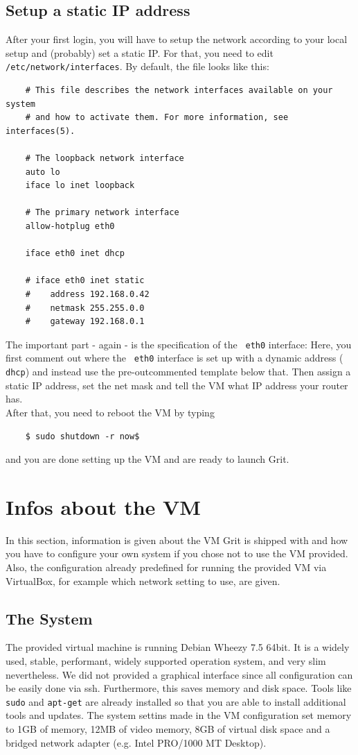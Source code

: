 \documentclass[10pt,a4paper, titlepage, toc=idx]{scrreprt}
\theoremstyle{definition}
\theoremstyle{plain}
\newcommand*{\product}{Grit}
\begin{document}
	\subsection{Setup a static IP address}
	After your first login, you will have to setup the network
        according to your local setup and (probably) set a static
        IP. For that, you need to edit {\tt
          /etc/network/interfaces}. By default, the file looks like
        this:\pagebreak
\begin{lstlisting}
	# This file describes the network interfaces available on your system
	# and how to activate them. For more information, see interfaces(5).
	
	# The loopback network interface
	auto lo
	iface lo inet loopback
	
	# The primary network interface
	allow-hotplug eth0
	
	iface eth0 inet dhcp
	
	# iface eth0 inet static
	#	 address 192.168.0.42
	#	 netmask 255.255.0.0
	#	 gateway 192.168.0.1
\end{lstlisting}
	The important part - again - is the specification of the {\tt
          eth0} interface: Here, you first comment out where the {\tt
          eth0} interface is set up with a dynamic address ({\tt
          dhcp}) and instead use the pre-outcommented template below
        that. Then assign a static IP address,
	set the net mask and tell the VM what IP address your router has.\\
	After that, you need to reboot the VM by typing
\begin{lstlisting}
	$ sudo shutdown -r now$
\end{lstlisting}
	and you are done setting up the VM and are ready to launch
        \product.
	\section{Infos about the VM}\label{4.3}
	In this section, information is given about the VM \product{} is
        shipped with and how you have to configure your own system if
        you chose not to use the VM provided. Also, the configuration
        already predefined for running the provided VM via VirtualBox,
        for example which network setting to use, are given.
	\subsection{The System}
	The provided virtual machine is running Debian Wheezy 7.5
        64bit. It is a widely used, stable, performant, widely
        supported operation system, and very slim nevertheless. We did
        not provided a graphical interface since all configuration can
        be easily done via ssh. Furthermore, this saves memory and
        disk space. Tools like {\tt sudo} and {\tt apt-get} are
        already installed so that you are able to install additional
        tools and updates. The system settins made in the VM
        configuration set memory to 1GB of memory, 12MB of video
        memory, 8GB of virtual disk space and a bridged network
        adapter (e.g. Intel PRO/1000 MT Desktop).
\end{document}

